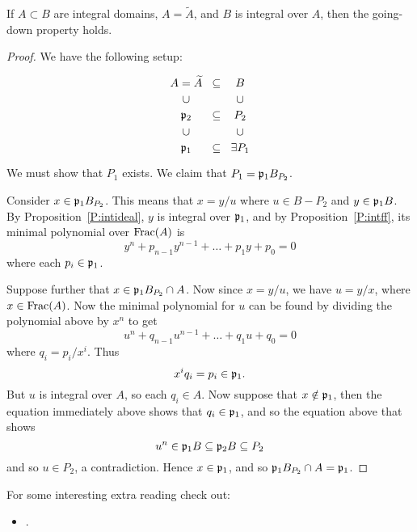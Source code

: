 \documentclass{ximera}
\begin{document}
\begin{theorem}
  If $A\subset B$ are integral domains, $A=\tilde{A}$, and $B$ is
  integral over $A$, then the going-down property holds.
  \begin{proof}
    We have the following setup:
    \[
    \begin{tikzcd}[row sep=0em,column sep=0em]
      A=\tilde{A}    & \subset & B \\
      \cup &         & \cup \\
      \p_2 & \subset & P_2 \\
      \cup &         & \cup \\
      \p_1 & \subset & \exists P_1  
    \end{tikzcd}
    \]
    We must show that $P_1$ exists. We claim that $P_1 = \mathfrak{p}_1 B_{P_2}$.

    Consider $x\in \mathfrak{p}_1 B_{P_2}$. This means that $x = y/u$ where
    $u\in B-P_2$ and $y\in \mathfrak{p}_1 B$. By Proposition~\ref{P:intideal},
    $y$ is integral over $\mathfrak{p}_1$, and by Proposition~\ref{P:intff}, its
    minimal polynomial over $\operatorname{Frac}(A)$ is
    \[
    y^n + p_{n-1}y^{n-1} + \dots + p_1 y + p_0 = 0
    \]
    where each $p_i\in\mathfrak{p}_1$.

    Suppose further that $x\in \mathfrak{p}_1 B_{P_2}\cap A$. Now since $x =
    y/u$, we have $u = y/x$, where $x\in\operatorname{Frac}(A)$. Now the minimal
    polynomial for $u$ can be found by dividing the polynomial above
    by $x^n$ to get
    \[
    u^n + q_{n-1} u^{n-1} + \dots + q_1 u + q_0 = 0
    \]
    where $q_i = p_i/x^i$. Thus
    \[
    x^i q_i = p_i \in \mathfrak{p}_1.
    \]
    But $u$ is integral over $A$, so each $q_i\in A$. Now suppose that
    $x\notin\mathfrak{p}_1$, then the equation immediately above shows that
    $q_i\in\mathfrak{p}_1$, and so the equation above that shows
    \[
    u^n\in \mathfrak{p}_1 B \subseteq \mathfrak{p}_2 B \subseteq P_2
    \]
    and so $u\in P_2$, a contradiction. Hence $x\in \mathfrak{p}_1$, and so
    $\mathfrak{p}_1 B_{P_2}\cap A = \mathfrak{p}_1$.
  \end{proof}
\end{theorem}





For some interesting extra reading check out:
\begin{itemize}
\item {}.
\end{itemize}
\end{document}
